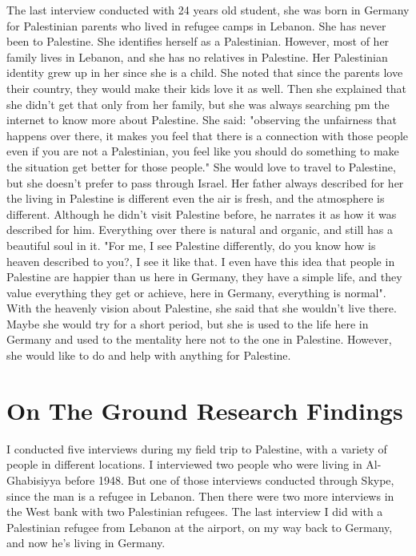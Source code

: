 The last interview conducted with  24 years old student, she was born in Germany for Palestinian parents who lived in refugee camps in Lebanon. She has never been to Palestine. She identifies herself as a Palestinian. However, most of her family lives in Lebanon, and she has no relatives in Palestine. Her Palestinian identity grew up in her since she is a child. She noted that since the parents love their country, they would make their kids love it as well. Then she explained that she didn't get that only from her family, but she was always searching pm the internet to know more about Palestine. She said: "observing the unfairness that happens over there, it makes you feel that there is a connection with those people even if you are not a Palestinian, you feel like you should do something to make the situation get better for those people." She would love to travel to Palestine, but she doesn't prefer to pass through Israel. Her father always described for her the living in Palestine is different even the air is fresh, and the atmosphere is different. Although he didn't visit Palestine before, he narrates it as how it was described for him. Everything over there is natural and organic, and still has a beautiful soul in it. "For me, I see Palestine differently, do you know how is heaven described to you?, I see it like that. I even have this idea that people in Palestine are happier than us here in Germany, they have a simple life, and they value everything they get or achieve, here in Germany, everything is normal". With the heavenly vision about Palestine, she said that she wouldn't live there. Maybe she would try for a short period, but she is used to the life here in Germany and used to the mentality here not to the one in Palestine. However, she would like to do and help with anything for Palestine.

\section{On The Ground Research Findings}

I conducted five interviews during my field trip to Palestine, with a variety of people in different locations. I interviewed two people who were living in Al-Ghabisiyya before 1948. But one of those interviews conducted through Skype, since the man is a refugee in Lebanon. Then there were two more interviews in the West bank with two Palestinian refugees. The last interview I did with a Palestinian refugee from Lebanon at the airport, on my way back to Germany, and now he's living in Germany.



